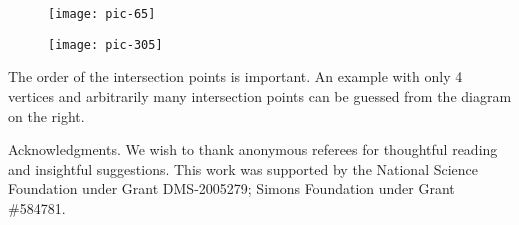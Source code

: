 \documentclass{article}
\theoremstyle{theorem}
\theoremstyle{definition}
\begin{document}
\begin{figure}[!ht]
\begin{minipage}{.48\textwidth}
\centering
\texttt{[image: pic-65]}
\end{minipage}\hfill
\begin{minipage}{.48\textwidth}
\centering
\texttt{[image: pic-305]}
\end{minipage}
\end{figure}

The order of the intersection points is important. 
An example with only 4 vertices and arbitrarily many intersection points can be guessed from the diagram on the right.

\begin{acknowledgment}{Acknowledgments.}
We wish to thank anonymous referees for thoughtful reading and insightful suggestions.
This work was supported by the National Science Foundation under Grant DMS-2005279; Simons Foundation under Grant \#584781.
\end{acknowledgment}
\end{document}
